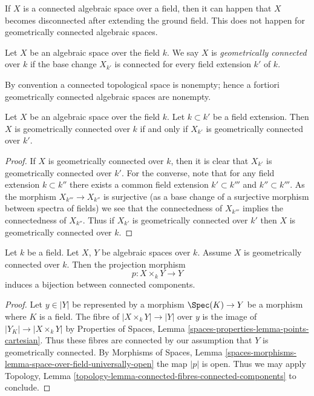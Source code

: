 \noindent
If $X$ is a connected algebraic space over a field, then it can happen that
$X$ becomes disconnected after extending the ground field. This does not
happen for geometrically connected algebraic spaces.

\begin{definition}
\label{definition-geometrically-connected}
Let $X$ be an algebraic space over the field $k$. We say $X$ is
{\it geometrically connected} over $k$ if the base change $X_{k'}$
is connected for every field extension $k'$ of $k$.
\end{definition}

\noindent
By convention a connected topological space is nonempty; hence a fortiori
geometrically connected algebraic spaces are nonempty.

\begin{lemma}
\label{lemma-geometrically-connected-check-after-extension}
Let $X$ be an algebraic space over the field $k$.
Let $k \subset k'$ be a field extension.
Then $X$ is geometrically connected over $k$ if and only if
$X_{k'}$ is geometrically connected over $k'$.
\end{lemma}

\begin{proof}
If $X$ is geometrically connected over $k$, then it is clear that
$X_{k'}$ is geometrically connected over $k'$. For the converse, note
that for any field extension $k \subset k''$ there exists a common
field extension $k' \subset k'''$ and $k'' \subset k'''$. As the
morphism $X_{k'''} \to X_{k''}$ is surjective (as a base change of
a surjective morphism between spectra of fields) we see that the
connectedness of $X_{k'''}$ implies the connectedness of $X_{k''}$.
Thus if $X_{k'}$ is geometrically connected over $k'$ then
$X$ is geometrically connected over $k$.
\end{proof}

\begin{lemma}
\label{lemma-bijection-connected-components}
Let $k$ be a field. Let $X$, $Y$ be algebraic spaces over $k$.
Assume $X$ is geometrically connected over $k$.
Then the projection morphism
$$
p : X \times_k Y \longrightarrow Y
$$
induces a bijection between connected components.
\end{lemma}

\begin{proof}
Let $y \in |Y|$ be represented by a morphism $\Spec(K) \to Y$ be a morphism
where $K$ is a field. The fibre of $|X \times_k Y| \to |Y|$ over $y$
is the image of $|Y_K| \to |X \times_k Y|$ by
Properties of Spaces, Lemma \ref{spaces-properties-lemma-points-cartesian}.
Thus these fibres are connected by our assumption that $Y$ is
geometrically connected. By
Morphisms of Spaces, Lemma
\ref{spaces-morphisms-lemma-space-over-field-universally-open}
the map $|p|$ is open.
Thus we may apply Topology,
Lemma \ref{topology-lemma-connected-fibres-connected-components}
to conclude.
\end{proof}

